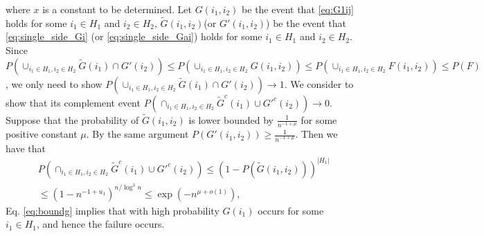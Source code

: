 \documentclass[conference]{IEEEtran}
\begin{document}
		where $x$ is a constant to be determined.
		Let $G(i_1,i_2)$ be the event that \eqref{eq:G1ij} holds for some $i_1\in H_1$ and $i_2\in H_2$,
		$\widetilde{G}(i_1,i_2)$(or $G'(i_1, i_2)$) be the event that \eqref{eq:single_side_Gi} (or \eqref{eq:single_side_Gai}) holds for some $i_1 \in H_1$ and $i_2 \in H_2$.
		Since $P(\cup_{i_1 \in H_1, i_2 \in H_2} \widetilde{G}(i_1) \cap G'(i_2) )\leq  P(\cup_{i_1\in H_1, i_2\in H_2} G(i_1,i_2)) \le P(\cup_{i_1\in H_1, i_2\in H_2} F(i_1,i_2)) \leq P(F)$, we only need to show $P(\cup_{i_1 \in H_1, i_2 \in H_2} \widetilde{G}(i_1) \cap G'(i_2) )\to 1$.
		We consider to show that its complement event $P(\cap_{i_1 \in H_1, i_2 \in H_2} \widetilde{G}^c(i_1) \cup G'^c(i_2) )\to 0$.
		Suppose that
		the probability of $\widetilde{G}(i_1,i_2)$ is lower bounded by $\frac{1}{n^{-1+\mu}}$ for some positive constant $\mu$.
		By the same argument $P(G'(i_1,i_2)) \geq \frac{1}{n^{-1+\mu}}$.
		Then we have that 
		\begin{align}
			& P(\cap_{i_1 \in H_1, i_2 \in H_2}\widetilde{G}^c(i_1) \cup G'^c(i_2) ) \leq (1 - P(\widetilde{G}(i_1,i_2)))^{|H_1|}\nonumber\\
			& \leq (1-n^{-1+u_1})^{n/\log^3 n} \leq \exp(-n^{\mu+ o(1)}), \label{eq:boundg}
		\end{align}
		Eq. \eqref{eq:boundg} implies that with high probability $G(i_1)$ occurs for some $i_1 \in H_1$, and hence the failure occurs.
		
\end{document}
